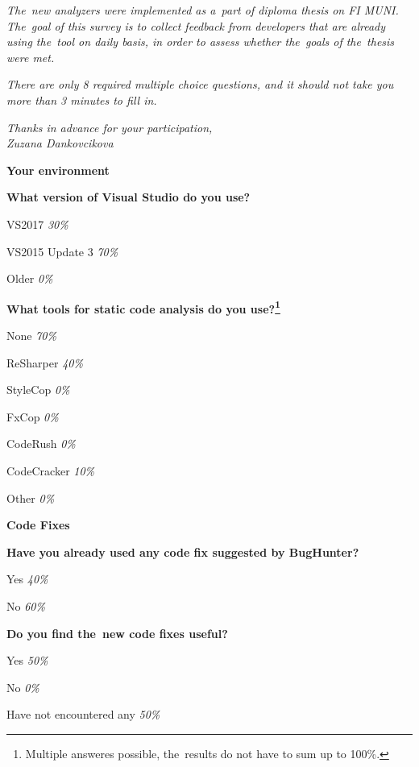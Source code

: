 \documentclass[
  digital, %
  table,   %
  lof,     %
  lot,     %
  oneside,
]{fithesis3}
\begin{document}
\textit{The~new analyzers were implemented as a~part of diploma thesis on FI MUNI. The~goal of this survey is to collect feedback from developers that are already using the~tool on daily basis, in order to assess whether the~goals of the~thesis were met.}

\textit{There are only 8 required multiple choice questions, and it should not take you more than 3 minutes to fill in.}

\bigskip\noindent
\textit{Thanks in advance for your participation,}
\\ \noindent
\textit{Zuzana Dankovcikova}

\begin{center}
\textbf{Your environment}
\end{center}

\smallskip\noindent
\textbf{What version of Visual Studio do you use?}
\begin{compactitem}
\item VS2017 \textit{30\%}
\item VS2015 Update 3 \textit{70\%}
\item Older \textit{0\%}
\end{compactitem}

\smallskip\noindent
\textbf{What tools for static code analysis do you use?\footnote{Multiple answeres possible, the~results do not have to sum up to 100\%.}}
\begin{compactitem}
\item None \textit{70\%}
\item ReSharper \textit{40\%}
\item StyleCop \textit{0\%}
\item FxCop \textit{0\%}
\item CodeRush \textit{0\%}
\item CodeCracker \textit{10\%}
\item Other \textit{0\%}
\end{compactitem}

\begin{center}
\textbf{Code Fixes}
\end{center}

\smallskip\noindent
\textbf{Have you already used any code fix suggested by BugHunter?}
\begin{compactitem}
\item Yes \textit{40\%}
\item No \textit{60\%}
\end{compactitem}

\smallskip\noindent
\textbf{Do you find the~new code fixes useful?}
\begin{compactitem}
\item Yes \textit{50\%}
\item No \textit{0\%}
\item Have not encountered any \textit{50\%}
\end{compactitem}
\end{document}
